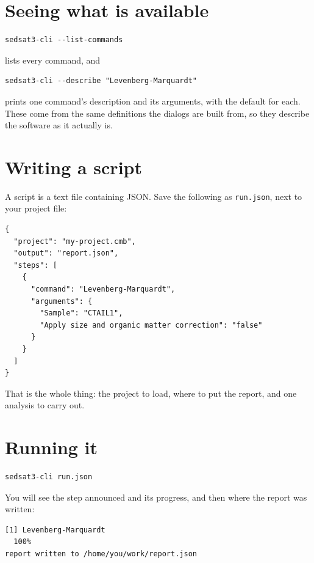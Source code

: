 \documentclass[11pt,a4paper]{report}
\begin{document}
\section{Seeing what is available}

\begin{lstlisting}
sedsat3-cli --list-commands
\end{lstlisting}

lists every command, and

\begin{lstlisting}
sedsat3-cli --describe "Levenberg-Marquardt"
\end{lstlisting}

prints one command's description and its arguments, with the default for each.
These come from the same definitions the dialogs are built from, so they
describe the software as it actually is.

\section{Writing a script}

A script is a text file containing JSON. Save the following as
\texttt{run.json}, next to your project file:

\begin{lstlisting}[language=scriptjson]
{
  "project": "my-project.cmb",
  "output": "report.json",
  "steps": [
    {
      "command": "Levenberg-Marquardt",
      "arguments": {
        "Sample": "CTAIL1",
        "Apply size and organic matter correction": "false"
      }
    }
  ]
}
\end{lstlisting}

That is the whole thing: the project to load, where to put the report, and one
analysis to carry out.

\section{Running it}

\begin{lstlisting}
sedsat3-cli run.json
\end{lstlisting}

You will see the step announced and its progress, and then where the report was
written:

\begin{lstlisting}
[1] Levenberg-Marquardt
  100%
report written to /home/you/work/report.json
\end{lstlisting}
\end{document}

